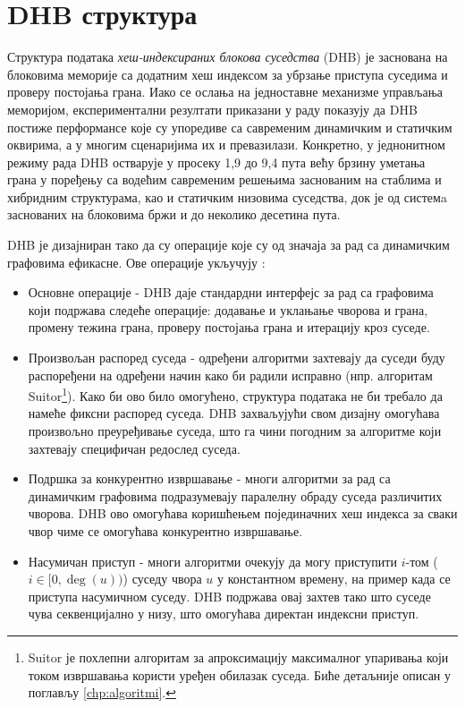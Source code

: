 \section{DHB структура}

Структура података \emph{хеш-индексираних блокова суседства} (DHB) је заснована на блоковима меморије са додатним хеш индексом за убрзање приступа суседима и проверу постојања грана. Иако се ослања на једноставне механизме управљања меморијом, експериментални резултати приказани у раду \cite{vandergrinten_et_al:LIPIcs.SEA.2022.11} показују да DHB постиже перформансе које су упоредиве са савременим динамичким и статичким оквирима, а у многим сценаријима их и превазилази. Конкретно, у једнонитном режиму рада DHB остварује у просеку 1,9 до 9,4 пута већу брзину уметања грана у поређењу са водећим савременим решењима заснованим на стаблима и хибридним структурама, као и статичким низовима суседства, док је од системa заснованих на блоковима бржи и до неколико десетина пута.

DHB је дизајниран тако да су операције које су од значаја за рад са динамичким графовима ефикасне. Ове операције укључују \cite{vandergrinten_et_al:LIPIcs.SEA.2022.11}:
\begin{itemize}
    \item Основне операције - DHB даје стандардни интерфејс за рад са графовима који подржава следеће операције: додавање и уклањање чворова и грана, промену тежина грана, проверу постојања грана и итерацију кроз суседе. 
    \item Произвољан распоред суседа - одређени алгоритми захтевају да суседи буду распоређени на одређени начин како би радили исправно (нпр. алгоритам Suitor\footnote{Suitor је похлепни алгоритам за апроксимацију максималног упаривања који током извршавања користи уређен обилазак суседа. Биће детаљније описан у поглављу \ref{chp:algoritmi}.}). Како би ово било омогућено, структура података не би требало да намеће фиксни распоред суседа. DHB захваљујући свом дизајну омогућава произвољно преуређивање суседа, што га чини погодним за алгоритме који захтевају специфичан редослед суседа.
    \item Подршка за конкурентно извршавање - многи алгоритми за рад са динамичким графовима подразумевају паралелну обраду суседа различитих чворова. DHB ово омогућава коришћењем појединачних хеш индекса за сваки чвор чиме се омогућава конкурентно извршавање. 
    \item Насумичан приступ - многи алгоритми очекују да могу приступити $i$-том ($i \in [0, \deg(u))$) суседу чвора $u$ у константном времену, на пример када се приступа насумичном суседу. DHB подржава овај захтев тако што суседе чува секвенцијално у низу, што омогућава директан индексни приступ. 
\end{itemize}

